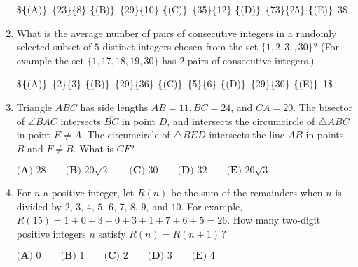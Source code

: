 \documentclass{article}
\begin{document}
\begin{enumerate}[label=\arabic*., itemsep=0.5em]
\$\textbf\{(A)\}\ \frac\{23\}\{8\} \qquad\textbf\{(B)\}\  \frac\{29\}\{10\} \qquad\textbf\{(C)\}\  \frac\{35\}\{12\} \qquad\textbf\{(D)\}\
\frac\{73\}\{25\} \qquad\textbf\{(E)\}\ 3\$\par \vspace{0.5em}\item What is the average number of pairs of consecutive integers in a randomly selected subset of $5$ distinct integers chosen from the set $\{ 1, 2, 3, , 30\}$? (For example the set $\{1, 17, 18, 19, 30\}$ has $2$ pairs of consecutive integers.)

\$\textbf\{(A)\}\ \frac\{2\}\{3\} \qquad\textbf\{(B)\}\ \frac\{29\}\{36\} \qquad\textbf\{(C)\}\ \frac\{5\}\{6\} \qquad\textbf\{(D)\}\
\frac\{29\}\{30\} \qquad\textbf\{(E)\}\ 1\$\par \vspace{0.5em}\item Triangle $ABC$ has side lengths $AB = 11, BC=24$, and $CA = 20$. The bisector of $\angle{BAC}$ intersects $\overline{BC}$ in point $D$, and intersects the circumcircle of $\triangle{ABC}$ in point $E \ne A$. The circumcircle of $\triangle{BED}$ intersects the line $AB$ in points $B$ and $F \ne B$. What is $CF$?

$\textbf{(A) } 28 \qquad \textbf{(B) } 20\sqrt{2} \qquad \textbf{(C) } 30 \qquad \textbf{(D) } 32 \qquad \textbf{(E) } 20\sqrt{3}$\par \vspace{0.5em}\item For $n$ a positive integer, let $R(n)$ be the sum of the remainders when $n$ is divided by $2$, $3$, $4$, $5$, $6$, $7$, $8$, $9$, and $10$. For example, $R(15) = 1+0+3+0+3+1+7+6+5=26$. How many two-digit positive integers $n$ satisfy $R(n) = R(n+1)\,?$

$\textbf{(A) }0\qquad\textbf{(B) }1\qquad\textbf{(C) }2\qquad\textbf{(D) }3\qquad\textbf{(E) }4$\par \vspace{0.5em}\end{enumerate}
\end{document}
